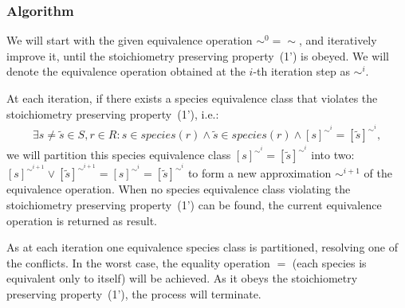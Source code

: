 \documentclass[9pt]{article}
\newcounter{rm}
\begin{document}
\subsubsection*{Algorithm}
We will start with the given equivalence operation $\sim^0 = \sim$, and iteratively improve it, until the stoichiometry preserving property~(1') is obeyed. We will denote the equivalence operation obtained at the $i$-th iteration step as $\sim^i$.

At each iteration, if there exists a species equivalence class that violates the stoichiometry preserving property~(1'), i.e.:
\[ \begin{array}{l}
\mbox{$\exists s \neq \tilde{s} \in S, r \in R: s \in species(r) \land \tilde{s} \in species(r) \land  [s]^{{\sim}^i} = [\tilde{s}]^{{\sim}^i}$}, 
\end{array} \]
we will partition this species equivalence class $[s]^{{\sim}^i} = [\tilde{s}]^{{\sim}^i}$ into two: $[s]^{{\sim}^{i+1}}  \vee [\tilde{s}]^{{\sim}^{i+1}}  = [s]^{{\sim}^i} = [\tilde{s}]^{{\sim}^i} $ to form a new approximation ${\sim}^{i+1}$ of the equivalence operation. When no species equivalence class violating the stoichiometry preserving property~(1') can be found, the current equivalence operation is returned as result.

As at each iteration one equivalence species class is partitioned, resolving one of the conflicts. In the worst case, the equality operation $=$ (each species is equivalent only to itself) will be achieved. As it obeys the stoichiometry preserving property~(1'), the process will terminate. \\
\end{document}
